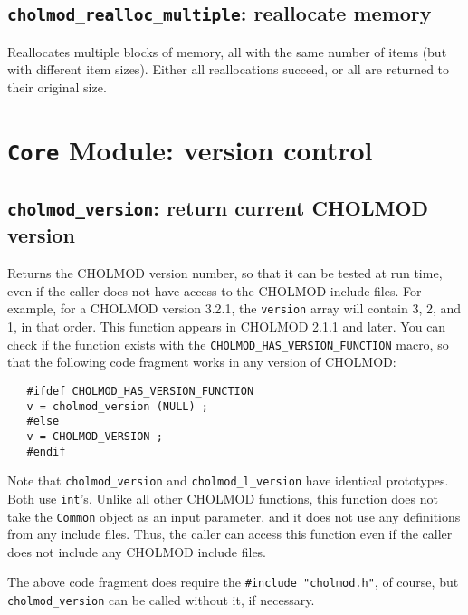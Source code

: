 \documentclass[11pt]{article}
\begin{document}
\newpage \subsection{{\tt cholmod\_realloc\_multiple}: reallocate memory}


Reallocates multiple blocks of memory, all with the same number of items
(but with different item sizes).  Either all reallocations succeed,
or all are returned to their original size.

\newpage \section{{\tt Core} Module: version control}

\subsection{{\tt cholmod\_version}: return current CHOLMOD version}


Returns the CHOLMOD version number, so that it can be tested at run time, even
if the caller does not have access to the CHOLMOD include files.  For example,
for a CHOLMOD version 3.2.1, the {\tt version} array will contain 3, 2, and 1,
in that order.  This function appears in CHOLMOD 2.1.1 and later.  You can
check if the function exists with the {\tt CHOLMOD\_HAS\_VERSION\_FUNCTION}
macro, so that the following code fragment works in any version of CHOLMOD:

\begin{verbatim}
   #ifdef CHOLMOD_HAS_VERSION_FUNCTION
   v = cholmod_version (NULL) ;
   #else
   v = CHOLMOD_VERSION ;
   #endif
\end{verbatim}

Note that {\tt cholmod\_version} and {\tt cholmod\_l\_version} have identical
prototypes.  Both use {\tt int}'s.  Unlike all other CHOLMOD functions, this
function does not take the {\tt Common} object as an input parameter, and it
does not use any definitions from any include files.  Thus, the caller can
access this function even if the caller does not include any CHOLMOD include
files.

The above code fragment does require the {\tt \#include "cholmod.h"},
of course, but {\tt cholmod\_version} can be called without it, if necessary.
\end{document}
